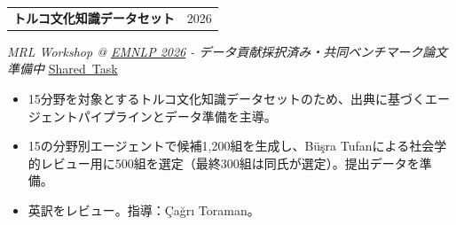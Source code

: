 \documentclass[11pt,a4paper]{article}
\makeatletter
\newcommand{\cvlink}[2]{\href{#1}{\textcolor{linkblue}{#2}}}
\newcommand{\cvheading}[2]{%
  \begin{tabularx}{\linewidth}{@{}>{\raggedright\arraybackslash}X@{\hspace{10pt}}r@{}}%
  \textbf{#1} & {\small\color{muted}#2}\\
  \end{tabularx}\par\nobreak
}
\newenvironment{cvpoints}{\begin{itemize}[leftmargin=12pt,itemsep=2pt,topsep=2pt,parsep=0pt]\small}{\end{itemize}}
\makeatother
\begin{document}
\begin{minipage}{\linewidth}\raggedright
\cvheading{トルコ文化知識データセット}{2026}
{\small{}\itshape{}\color{muted}MRL Workshop @ \cvlink{https://2026.emnlp.org/}{EMNLP 2026} - データ貢献採択済み・共同ベンチマーク論文準備中}\hfill{\small{}%
\mbox{\cvlink{https://mrlbenchmarks.github.io/}{Shared Task}}%
}\par\vspace{2pt}
\begin{cvpoints}
\item 15分野を対象とするトルコ文化知識データセットのため、出典に基づくエージェントパイプラインとデータ準備を主導。
\item 15の分野別エージェントで候補1,200組を生成し、Büşra Tufanによる社会学的レビュー用に500組を選定（最終300組は同氏が選定）。提出データを準備。
\item 英訳をレビュー。指導：Çağrı Toraman。
\end{cvpoints}
\end{minipage}\par\vspace{5pt}
\end{document}
